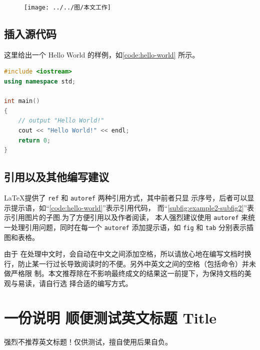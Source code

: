 \documentclass[lang=chs, degree=master, blindreview=false, adobe=false]{yanputhesis}
\begin{document}
\begin{figure}
	\centering
	\texttt{[image: ../../图/本文工作]}
	\caption{}
	\label{fig:}
\end{figure}
\section{插入源代码}

这里给出一个 Hello World 的样例，如\autoref{code:hello-world} 所示。

\begin{lstlisting}[language={C++}, label={code:hello-world},
    caption={Hello World.cpp}]
#include <iostream>
using namespace std;

int main()
{
    // output "Hello World!"
    cout << "Hello World!" << endl;
    return 0;
}
\end{lstlisting}

\section{引用以及其他编写建议}

\LaTeX 提供了 \lstinline`ref` 和 \lstinline`autoref` 两种引用方式，其中前者只显
示序号，后者可以显示提示语，如“\autoref{code:hello-world}”表示引用代码，
而“\autoref{subfig:example2-subfig2}”表示引用图片的子图.为了方便引用以及作者阅读，
本人强烈建议使用 \lstinline`autoref` 来统一处理引用问题，同时在每一个
\lstinline`autoref` 添加提示语，如 \lstinline`fig` 和 \lstinline`tab` 分别表示插
图和表格。

由于 \XeLaTeX 在处理中文时，会自动在中文之间添加空格，所以请放心地在编写文档时换
行，防止某一行过长导致阅读时的不便。另外中英文之间的空格（包括命令）并未做严格限
制。本文推荐除在不影响最终成文的结果这一前提下，为保持文档的美观与易读，请自行选
择合适的编写方式。

\cleardoublepage
\appendix
\chapter{一份说明 顺便测试英文标题 Title}

强烈不推荐英文标题！仅供测试，擅自使用后果自负。
\end{document}
